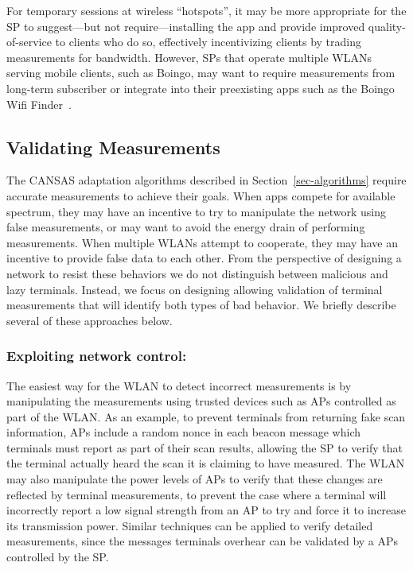 For temporary sessions at wireless ``hotspots'', it may be more appropriate
for the SP to suggest---but not require---installing the \PS{} app
and provide improved quality-of-service to clients who do so, effectively
incentivizing clients by trading measurements for bandwidth. However, SPs
that operate multiple WLANs serving mobile clients, such as Boingo, may want
to require measurements from long-term subscriber or integrate \PS{}
into their preexisting apps such as the Boingo Wifi
Finder~\cite{boingo-playstore-url}.

\subsection{Validating Measurements}
\label{subsec-validation}

The CANSAS adaptation algorithms described in Section~\ref{sec-algorithms}
require accurate measurements to achieve their goals. When apps compete for
available spectrum, they may have an incentive to try to manipulate the network
using false measurements, or may want to avoid the energy drain of performing
measurements. When multiple WLANs attempt to cooperate, they may have an
incentive to provide false data to each other. From the perspective of designing
a network to resist these behaviors we do not distinguish between malicious and
lazy terminals. Instead, we focus on designing \PS{} allowing validation of
terminal measurements that will identify both types of bad behavior. We briefly
describe several of these approaches below.

\subsubsection{Exploiting network control:\space} The easiest way for the
WLAN to detect incorrect measurements is by manipulating the
measurements using trusted devices such as APs controlled as part of
the WLAN. As an example, to prevent terminals from returning fake scan
information, \PS{} APs include a random nonce in each beacon
message which terminals must report as part of their scan results,
allowing the SP to verify that the terminal actually heard the scan it
is claiming to have measured. The WLAN may also manipulate the power
levels of APs to verify that these changes are reflected by terminal
measurements, to prevent the case where a terminal will incorrectly
report a low signal strength from an AP to try and force it to
increase its transmission power. Similar techniques can be applied to
verify detailed measurements, since the messages terminals overhear
can be validated by a APs controlled by the SP.

